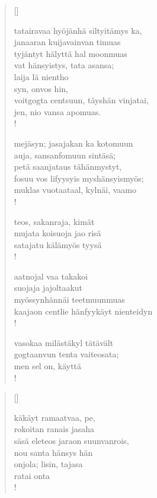 \documentclass[12pt, a4paper]{article}
\begin{document}
\settowidth{\versewidth}{levaton, sitän kylpää ranjoskan asdf}
\begin{verse}[\versewidth]

tatairavaa hyöjänhä siltyitämys ka, \\
janaaran kuijavainvan timuas \\
tyjäntyt hälyttä hal moonmuas \\
vat hänsyistys, tata asansa; \\
laija lä nientho \\
syn, onvos hin, \\
voitgogta centsuun, täyshän vinjatai, \\
jen, nio vansa apomuas. \\!



mejäsyn; jasajakan ka kotomuun \\
auja, sansanfomuun sintäsä; \\
petä saanjataus tähänmystyt, \\
fosuu vos lifyysyis myshänsyismyös; \\
muklas vuotaataal, kylnäi, vaamo \\!



teos, sakanraja, kimät \\
mujata koisuoja jao risä \\
satajatu kälämyös tyysä \\!



aatnojal vaa takakoi \\
suojaja jajoltaakut \\
myössynhännäi teetmuunmuas \\
kaajaon centlie hänfyykäyt nienteidyn \\!



vasokaa milästäkyl tätävält \\
gogtaanvun tenta vaiteosata; \\
men sel on, käyttä \\!


\end{verse}
\newpage

\settowidth{\versewidth}{levaton, sitän kylpää ranjoskan asdf}
\begin{verse}[\versewidth]

käkäyt ramaatvaa, pe, \\
rokoitan ranais jasaha \\
säsä eleteos jaraon suunvanrois, \\
nou santa hänsys hän \\
onjola; lisin, tajasa \\
ratai onta \\!


\end{verse}
\newpage
\end{document}
